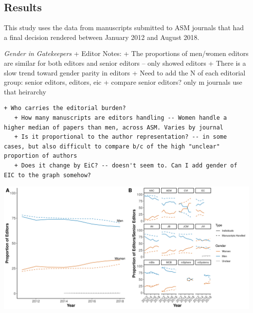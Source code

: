 \documentclass[11pt,]{article}
\begin{document}
\subsection{Results}\label{results}

This study uses the data from manuscripts submitted to ASM journals that
had a final decision rendered between January 2012 and August 2018.

\emph{Gender in Gatekeepers} + Editor Notes: + The proportions of
men/women editors are similar for both editors and senior editors --
only showed editors + There is a slow trend toward gender parity in
editors + Need to add the N of each editorial group: senior editors,
editors, eic + compare senior editors? only m journals use that
heirarchy

\begin{verbatim}
+ Who carries the editorial burden?
   + How many manuscripts are editors handling -- Women handle a higher median of papers than men, across ASM. Varies by journal
   + Is it proportional to the author representation? -- in some cases, but also difficult to compare b/c of the high "unclear" proportion of authors
   + Does it change by EiC? -- doesn't seem to. Can I add gender of EIC to the graph somehow?
\end{verbatim}

\includegraphics{Figure_1.png}
\end{document}
